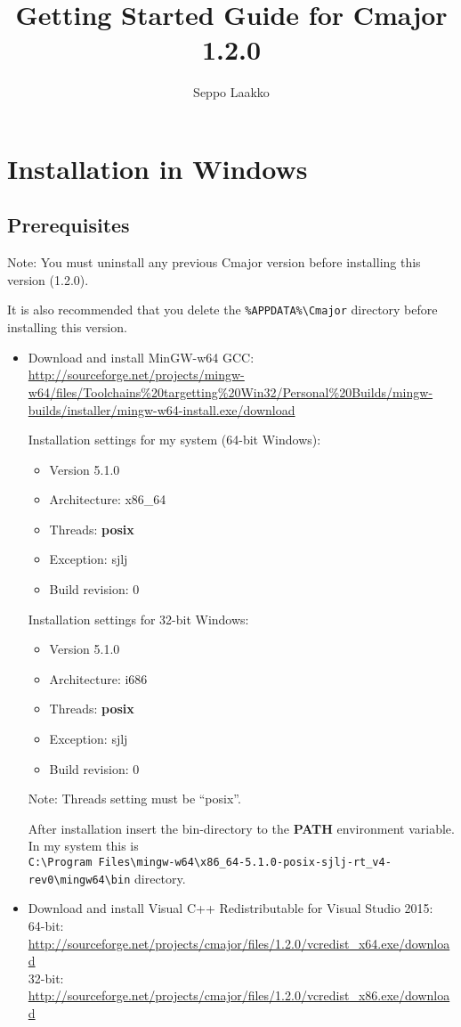\documentclass[oneside, a4paper, 11pt]{article}
\begin{document}
\title{Getting Started Guide for Cmajor 1.2.0}
\author{Seppo Laakko}
\maketitle

\section{Installation in Windows}

\subsection{Prerequisites}

Note:
You must uninstall any previous Cmajor version before installing
this version (1.2.0).

It is also recommended that you delete the
\verb|%APPDATA%\Cmajor| directory before installing
this version.

\begin{itemize}

\item
Download and install MinGW-w64 GCC:\\
\url{http://sourceforge.net/projects/mingw-w64/files/Toolchains%20targetting%20Win32/Personal%20Builds/mingw-builds/installer/mingw-w64-install.exe/download}

Installation settings for my system (64-bit Windows):
\begin{itemize}
\item
Version 5.1.0
\item
Architecture: x86\_64
\item
Threads: \textbf{posix}
\item
Exception: sjlj
\item
Build revision: 0
\end{itemize}

Installation settings for 32-bit Windows:
\begin{itemize}
\item
Version 5.1.0
\item
Architecture: i686
\item
Threads: \textbf{posix}
\item
Exception: sjlj
\item
Build revision: 0
\end{itemize}

Note: Threads setting must be ``posix''.

After installation insert the bin-directory to the \textbf{PATH} environment variable.
In my system this is\\
\verb|C:\Program Files\mingw-w64\x86_64-5.1.0-posix-sjlj-rt_v4-rev0\mingw64\bin| directory.

\item
Download and install Visual C++ Redistributable for Visual Studio 2015:\\
64-bit: \url{http://sourceforge.net/projects/cmajor/files/1.2.0/vcredist_x64.exe/download}\\
32-bit: \url{http://sourceforge.net/projects/cmajor/files/1.2.0/vcredist_x86.exe/download}
\end{itemize}
\end{document}
